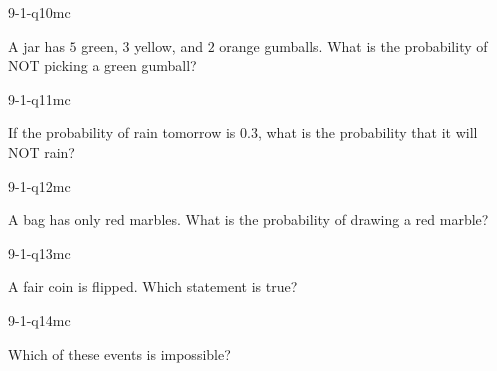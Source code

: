 \begin{practiceQuestion}{9-1-q10}{mc}
\begin{questionText}
A jar has $5$ green, $3$ yellow, and $2$ orange gumballs. What is the probability of NOT picking a green gumball?
\end{questionText}
\end{practiceQuestion}

\begin{practiceQuestion}{9-1-q11}{mc}
\begin{questionText}
If the probability of rain tomorrow is $0.3$, what is the probability that it will NOT rain?
\end{questionText}
\end{practiceQuestion}

\begin{practiceQuestion}{9-1-q12}{mc}
\begin{questionText}
A bag has only red marbles. What is the probability of drawing a red marble?
\end{questionText}
\end{practiceQuestion}

\begin{practiceQuestion}{9-1-q13}{mc}
\begin{questionText}
A fair coin is flipped. Which statement is true?
\end{questionText}
\end{practiceQuestion}

\begin{practiceQuestion}{9-1-q14}{mc}
\begin{questionText}
Which of these events is impossible?
\end{questionText}
\end{practiceQuestion}

